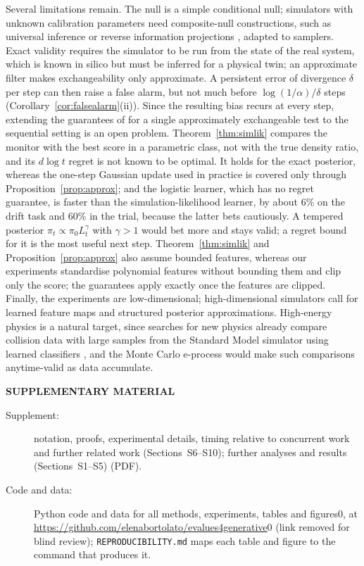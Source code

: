 \documentclass[12pt]{article}
\theoremstyle{remark}
\newcommand{\blind}{0}
\begin{document}
Several limitations remain. The null is a simple conditional null; simulators
with unknown calibration parameters need composite-null constructions, such
as universal inference or reverse information projections
\citep{grunwald2024safe}, adapted to samplers. Exact validity requires the simulator to be run from the state of the real
system, which is known in silico but must be inferred for a physical twin; an
approximate filter makes exchangeability only approximate. A persistent error
of divergence $\delta$ per step can then raise a false alarm, but not much
before $\log(1/\alpha)/\delta$ steps (Corollary~\ref{cor:falsealarm}(ii)).
Since the resulting bias recurs at every step, extending the guarantees of \citet{barber2026montecarlo} for a
single approximately exchangeable test to the sequential setting is an open
problem. Theorem~\ref{thm:simlik} compares the monitor with the best score in
a parametric class, not with the true density ratio, and its $d\log t$ regret
is not known to be optimal. It holds for the exact posterior, whereas the one-step Gaussian update used in
practice is covered only through Proposition~\ref{prop:approx}; and the
logistic learner, which has no regret guarantee, is faster than the
simulation-likelihood learner, by about 6\% on the drift task and 60\% in the
trial, because the latter bets cautiously. A tempered posterior
$\pi_t \propto \pi_0 L_t^{\gamma}$ with $\gamma > 1$
\citep{sinharoy2026prequential} would bet more and stays valid; a regret bound
for it is the most useful next step.
Theorem~\ref{thm:simlik} and Proposition~\ref{prop:approx} also assume bounded
features, whereas our experiments standardise polynomial features without
bounding them and clip only the score; the guarantees apply exactly once the
features are clipped. Finally, the experiments are low-dimensional;
high-dimensional simulators call for learned feature maps and structured
posterior approximations. High-energy physics is a natural target, since
searches for new physics already compare collision data with large samples
from the Standard Model simulator using learned classifiers
\citep{dagnolo2019learning}, and the Monte Carlo e-process would make such
comparisons anytime-valid as data accumulate.

\bigskip
\begin{center}
{\large\bf SUPPLEMENTARY MATERIAL}
\end{center}

\begin{description}
\item[Supplement:] notation, proofs, experimental details, timing relative to
concurrent work and further related work (Sections~S6--S10); further
analyses and results (Sections~S1--S5) (PDF).
\item[Code and data:] Python code and data for all methods, experiments, tables
and figures\blind, at \url{https://github.com/elenabortolato/evalues4generative}\fi{}\blind{} (link removed for blind review)\fi; \texttt{REPRODUCIBILITY.md} maps each table and figure to the
command that produces it.
\end{description}
\end{document}
